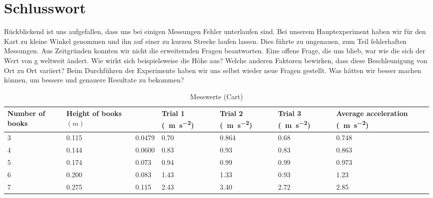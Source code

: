 \documentclass[a4paper, titlepage]{article}
\newcommand{\accunit}[1]{\SI{#1}{\metre\per\square\second}}
\begin{document}
    \section{Schlusswort}
    Rückblickend ist uns aufgefallen, dass uns bei einigen Messungen 
    Fehler unterlaufen sind. Bei unserem Hauptexperiment haben wir 
    für den Kart zu kleine Winkel genommen und ihn auf einer zu 
    kurzen Strecke laufen lassen. Dies führte zu ungenauen, zum Teil 
    fehlerhaften Messungen. Aus Zeitgründen konnten wir nicht die
    erweiternden Fragen beantworten. Eine offene Frage, die uns blieb, 
    war wie die sich der Wert von g weltweit ändert. Wie wirkt sich 
    beispielsweise die Höhe aus? Welche anderen Faktoren bewirken, 
    dass diese Beschleunigung von Ort zu Ort variiert? 
    Beim Durchführen der Experimente haben wir uns selbst wieder neue 
    Fragen gestellt. Was hätten wir besser machen können, um bessere 
    und genauere Resultate zu bekommen?
    
    
    
    
    \begin{table}
        \begin{tabularx}{\textwidth}{|X|X|X|X|X|X|X|}
            \hline
            \textbf{Number of books} & \textbf{Height of books $(m)$} & 
            \boldmath{$\sin{\theta}$} & \textbf{Trial 1}
            (\accunit{}) & 
            \textbf{Trial 2} (\accunit{}) & 
            \textbf{Trial 3} (\accunit{}) & 
            \textbf{Average acceleration} (\accunit{}) \\
            \hline
            3 & 0.115 & 0.0479 & 0.70 & 0.864 & 0.68 & 0.748 \\
            \hline
            4 & 0.144 & 0.0600 & 0.83 & 0.93 & 0.83 & 0.863 \\
            \hline
            5 & 0.174 & 0.073 & 0.94 & 0.99 & 0.99 & 0.973 \\
            \hline
            6 & 0.200 & 0.083 & 1.43 & 1.33 & 0.93 & 1.23 \\
            \hline
            7 & 0.275 & 0.115 & 2.43 & 3.40 & 2.72 & 2.85 \\
            \hline
        \end{tabularx}
        \caption{Messwerte (Cart)}
        \label{cart}
    \end{table}
    
\end{document}
